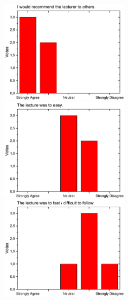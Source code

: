 \begin{figure}[h!]
\begin{minipage}{.48\linewidth}
  \end{minipage}\quad
  \begin{minipage}{.48\linewidth}
    \centering
      {\includegraphics[height=50mm]{figures/n/Graph104.pdf}}
      {\includegraphics[height=50mm]{figures/n/Graph105.pdf}}
      {\includegraphics[height=50mm]{figures/n/Graph106.pdf}}
  \end{minipage}
\end{figure}

